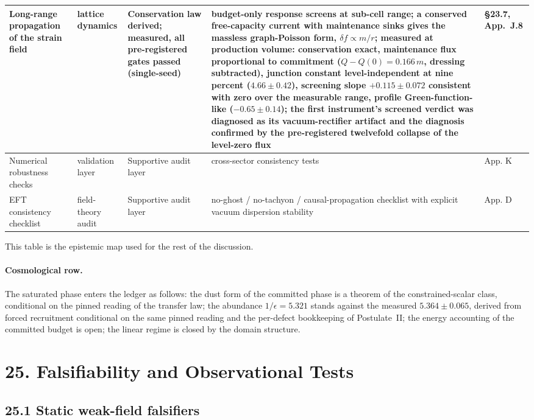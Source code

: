 \documentclass[11pt]{article}
\begin{document}
\begin{longtable}{|L{0.18\textwidth}|L{0.13\textwidth}|L{0.16\textwidth}|L{0.33\textwidth}|L{0.13\textwidth}|}
\hline
Long-range propagation of the strain field & lattice dynamics & Conservation law derived; measured, all pre-registered gates passed (single-seed) & budget-only response screens at sub-cell range; a conserved free-capacity current with maintenance sinks gives the massless graph-Poisson form, $\delta f\propto m/r$; measured at production volume: conservation exact, maintenance flux proportional to commitment ($Q-Q(0)=0.166\,m$, dressing subtracted), junction constant level-independent at nine percent ($4.66\pm0.42$), screening slope $+0.115\pm0.072$ consistent with zero over the measurable range, profile Green-function-like ($-0.65\pm0.14$); the first instrument's screened verdict was diagnosed as its vacuum-rectifier artifact and the diagnosis confirmed by the pre-registered twelvefold collapse of the level-zero flux & \S23.7, App.~J.8 \\
\hline
Numerical robustness checks & validation layer & Supportive audit layer & cross-sector consistency tests & App. K \\
\hline
EFT consistency checklist & field-theory audit & Supportive audit layer & no-ghost / no-tachyon / causal-propagation checklist with explicit vacuum dispersion stability & App. D \\
\hline
\end{longtable}
\endgroup

This table is the epistemic map used for the rest of the discussion.

\paragraph{Cosmological row.}
The saturated phase enters the ledger as follows: the dust form of the committed phase is a theorem of the constrained-scalar class, conditional on the pinned reading of the transfer law; the abundance $1/\epsilon=5.321$ stands against the measured $5.364\pm0.065$, derived from forced recruitment conditional on the same pinned reading and the per-defect bookkeeping of Postulate~II; the energy accounting of the committed budget is open; the linear regime is closed by the domain structure.

\section{25. Falsifiability and Observational Tests}

\subsection{25.1 Static weak-field falsifiers}
\end{document}
